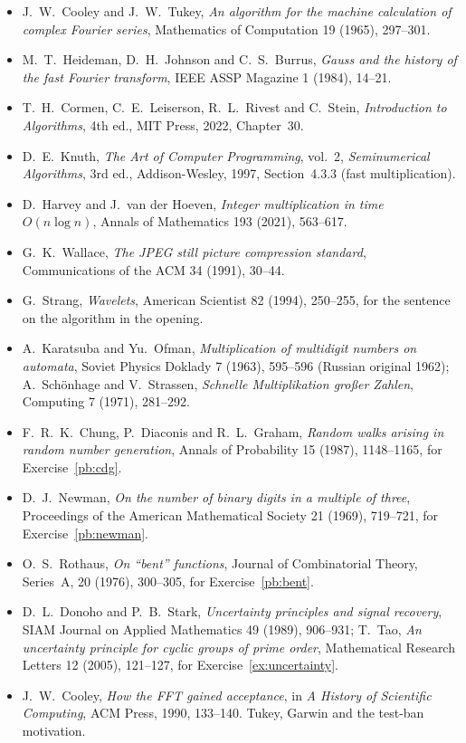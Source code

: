 \begin{itemize}
\item J.~W.~Cooley and J.~W.~Tukey, \emph{An algorithm for the machine calculation of complex Fourier series},
Mathematics of Computation 19 (1965), 297--301.
\item M.~T.~Heideman, D.~H.~Johnson and C.~S.~Burrus, \emph{Gauss and the history of the fast Fourier transform}, IEEE ASSP
Magazine 1 (1984), 14--21.
\item T.~H.~Cormen, C.~E.~Leiserson, R.~L.~Rivest and C.~Stein, \emph{Introduction to Algorithms}, 4th ed., MIT Press, 2022,
Chapter~30.
\item D.~E.~Knuth, \emph{The Art of Computer Programming}, vol.~2, \emph{Seminumerical Algorithms}, 3rd ed., Addison-Wesley,
1997, Section~4.3.3 (fast multiplication).
\item D.~Harvey and J.~van der Hoeven, \emph{Integer multiplication in time $O(n\log n)$}, Annals of Mathematics 193 (2021),
563--617.
\item G.~K.~Wallace, \emph{The JPEG still picture compression standard}, Communications of the ACM 34 (1991), 30--44.
\item G.~Strang, \emph{Wavelets}, American Scientist 82 (1994), 250--255, for the sentence on the algorithm in the opening.
\item A.~Karatsuba and Yu.~Ofman, \emph{Multiplication of multidigit numbers on automata}, Soviet Physics Doklady 7 (1963),
595--596 (Russian original 1962); A.~Sch\"onhage and V.~Strassen, \emph{Schnelle Multiplikation gro\ss er Zahlen}, Computing 7
(1971), 281--292.
\item F.~R.~K.~Chung, P.~Diaconis and R.~L.~Graham, \emph{Random walks arising in random number generation}, Annals of
Probability 15 (1987), 1148--1165, for Exercise~\ref{pb:cdg}.
\item D.~J.~Newman, \emph{On the number of binary digits in a multiple of three}, Proceedings of the American Mathematical
Society 21 (1969), 719--721, for Exercise~\ref{pb:newman}.
\item O.~S.~Rothaus, \emph{On ``bent'' functions}, Journal of Combinatorial Theory, Series~A, 20 (1976), 300--305, for
Exercise~\ref{pb:bent}.
\item D.~L.~Donoho and P.~B.~Stark, \emph{Uncertainty principles and signal recovery}, SIAM Journal on Applied Mathematics 49
(1989), 906--931; T.~Tao, \emph{An uncertainty principle for cyclic groups of prime order}, Mathematical Research Letters 12
(2005), 121--127, for Exercise~\ref{ex:uncertainty}.
\item J.~W.~Cooley, \emph{How the FFT gained acceptance}, in \emph{A History of Scientific Computing}, ACM Press, 1990, 133--140. Tukey, Garwin and the test-ban motivation.
\end{itemize}

